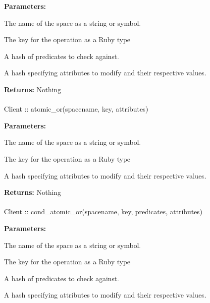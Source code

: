 \noindent\textbf{Parameters:}
\begin{description}[labelindent=\widthof{{predicates}},leftmargin=*,noitemsep,nolistsep,align=right]
\item[spacename] The name of the space as a string or symbol.
\item[key] The key for the operation as a Ruby type
\item[predicates] A hash of predicates to check against.
\item[attributes] A hash specifying attributes to modify and their respective values.
\end{description}

\noindent\textbf{Returns:}
Nothing

\paragraph{}
\begin{ccode}
Client :: atomic_or(spacename, key, attributes)
\end{ccode}
\funcdesc 

\noindent\textbf{Parameters:}
\begin{description}[labelindent=\widthof{{attributes}},leftmargin=*,noitemsep,nolistsep,align=right]
\item[spacename] The name of the space as a string or symbol.
\item[key] The key for the operation as a Ruby type
\item[attributes] A hash specifying attributes to modify and their respective values.
\end{description}

\noindent\textbf{Returns:}
Nothing

\paragraph{}
\begin{ccode}
Client :: cond_atomic_or(spacename, key, predicates, attributes)
\end{ccode}
\funcdesc 

\noindent\textbf{Parameters:}
\begin{description}[labelindent=\widthof{{predicates}},leftmargin=*,noitemsep,nolistsep,align=right]
\item[spacename] The name of the space as a string or symbol.
\item[key] The key for the operation as a Ruby type
\item[predicates] A hash of predicates to check against.
\item[attributes] A hash specifying attributes to modify and their respective values.
\end{description}

